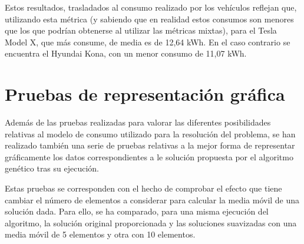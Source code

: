 \documentclass[11pt,spanish,listoffigures,listoftables]{tfgetsinf}
\begin{document}
Estos resultados, trasladados al consumo realizado por los vehículos reflejan que, utilizando esta métrica (y sabiendo que en realidad estos consumos son menores que los que podrían obtenerse al utilizar las métricas mixtas), para el Tesla Model X, que más consume, de media es de 12,64 kWh. En el caso contrario se encuentra el Hyundai Kona, con un menor consumo de 11,07 kWh.

\newpage
\section{Pruebas de representación gráfica}
Además de las pruebas realizadas para valorar las diferentes posibilidades relativas al modelo de consumo utilizado para la resolución del problema, se han realizado también una serie de pruebas relativas a la mejor forma de representar gráficamente los datos correspondientes a le solución propuesta por el algoritmo genético tras su ejecución.

Estas pruebas se corresponden con el hecho de comprobar el efecto que tiene cambiar el número de elementos a considerar para calcular la media móvil de una solución dada. Para ello, se ha comparado, para una misma ejecución del algoritmo, la solución original proporcionada y las soluciones suavizadas con una media móvil de 5 elementos y otra con 10 elementos.
\end{document}

